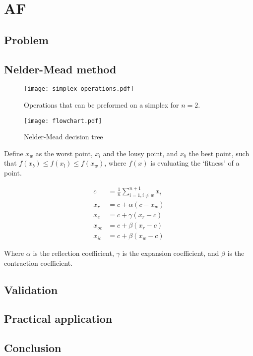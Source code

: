 \chapter{AF}
\label{chap:salvo}
\section{Problem}




\section{Nelder-Mead method}

\begin{figure}[!htbp]
    \centering
    \texttt{[image: simplex-operations.pdf]}
    \caption{Operations that can be preformed on a simplex for $n=2$.}
    \label{fig:NM-operations}
\end{figure}

\begin{figure}[!htbp]
    \centering
    \texttt{[image: flowchart.pdf]}
    \caption{Nelder-Mead decision tree}
    \label{fig:NM-algo}
\end{figure}




Define $x_w$ as the worst point, $x_l$ and the lousy point, and $x_b$ the best point, such that $f(x_b)\leq f(x_l)\leq f(x_w)$, where $f(x)$ is evaluating the `fitness' of a point.

\begin{align}
c &= \frac{1}{n}\sum \limits_{i=1,i\neq w}^{n+1} x_i \label{eqn:centroid}\\
x_r &= c + \alpha(c - x_w)\label{eqn:reflect}\\
x_e &= c + \gamma(x_r - c)\label{eqn:expand}\\
x_{oc} &= c + \beta(x_r - c)\label{eqn:outsidecontract}\\
x_{ic} &= c + \beta(x_w - c)\label{eqn:insidecontract}
\end{align}

Where $\alpha$ is the reflection coefficient, $\gamma$ is the expansion coefficient, and $\beta$ is the contraction coefficient.





\section{Validation}
\section{Practical application}
\section{Conclusion}
